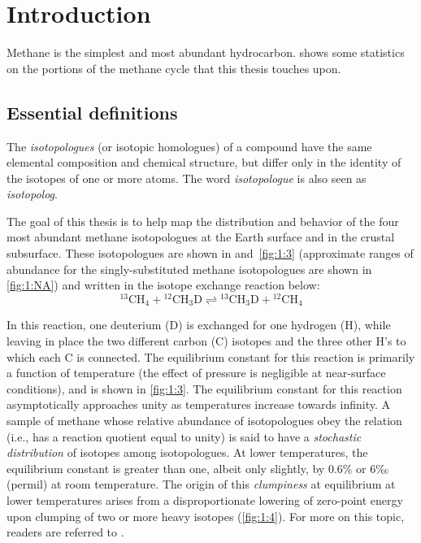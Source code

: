 \chapter{Introduction}\label{ch:1}



Methane is the simplest and most abundant hydrocarbon.  shows some statistics on the
portions of the methane cycle that this thesis touches upon.

\section{Essential definitions}\label{sec:1:essential-definitions}



The \emph{isotopologues} (or isotopic homologues) of a compound have the
same elemental composition and chemical structure, but differ only in
the identity of the isotopes of one or more atoms. The word
\emph{isotopologue} is also seen as \emph{isotopolog}.





The goal of this thesis is to help map the distribution and behavior of
the four most abundant methane isotopologues at the Earth surface and in
the crustal subsurface. These isotopologues are shown in  and~\ref{fig:1:3} (approximate ranges of abundance for the singly-substituted methane isotopologues are 
shown in \autoref{fig:1:NA}) and
written in the isotope exchange reaction below:
\begin{equation}\label{eqn:1:exchange}
{}^{13}\text{CH}_4+ {}^{12}{\text{CH}}_3\text{D}\rightleftharpoons {}^{13}{\text{CH}}_3\text{D}+ {}^{12}{\text{CH}}_4
\end{equation}



In this reaction, one deuterium (D) is exchanged for one hydrogen (H),
while leaving in place the two different carbon (C) isotopes and the
three other H's to which each C is connected. The equilibrium constant
for this reaction is primarily a function of temperature (the
effect of pressure is negligible at near-surface conditions), and is
shown in \autoref{fig:1:3}. The equilibrium constant for this reaction
asymptotically approaches unity as temperatures increase towards
infinity. A sample of methane whose relative abundance of isotopologues
obey the relation
(i.e., has a reaction quotient equal to unity) is said to have a
\emph{stochastic distribution} of isotopes among isotopologues. At
lower temperatures, the equilibrium constant is greater than one, albeit
only slightly, by 0.6\% or 6‰ (permil) at room temperature. The origin
of this \emph{clumpiness} at equilibrium at lower temperatures arises from a disproportionate lowering of zero-point energy upon clumping of two or more heavy isotopes (\autoref{fig:1:4}). For more on this topic, readers are referred to \textcite{Eiler_2007_EPSL}.

